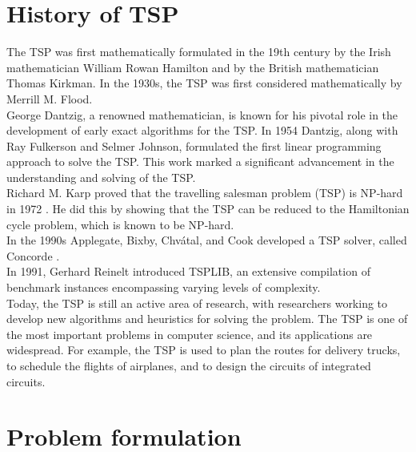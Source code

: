 \section{History of TSP}
The TSP was first mathematically formulated in the 19th century by the Irish mathematician William Rowan Hamilton and by the British mathematician Thomas Kirkman. In the 1930s, the TSP was first considered mathematically by Merrill M. Flood.\\
George Dantzig, a renowned mathematician, is known for his pivotal role in the development of early exact algorithms for the TSP. In 1954 Dantzig, along with Ray Fulkerson and Selmer Johnson, formulated the first linear programming approach to solve the TSP. This work marked a significant advancement in the understanding and solving of the TSP.\\
Richard M. Karp proved that the travelling salesman problem (TSP) is NP-hard in 1972 \cite{karp1972reducibility}. He did this by showing that the TSP can be reduced to the Hamiltonian cycle problem, which is known to be NP-hard.\\
In the 1990s  Applegate, Bixby, Chvátal, and Cook developed a TSP solver, called Concorde \cite{Concorde}. \\
In 1991, Gerhard Reinelt introduced TSPLIB\cite{TSPLIB}, an extensive compilation of benchmark instances encompassing varying levels of complexity.\\
Today, the TSP is still an active area of research, with researchers working to develop new algorithms and heuristics for solving the problem. The TSP is one of the most important problems in computer science, and its applications are widespread. For example, the TSP is used to plan the routes for delivery trucks, to schedule the flights of airplanes, and to design the circuits of integrated circuits.


\section{Problem formulation}


